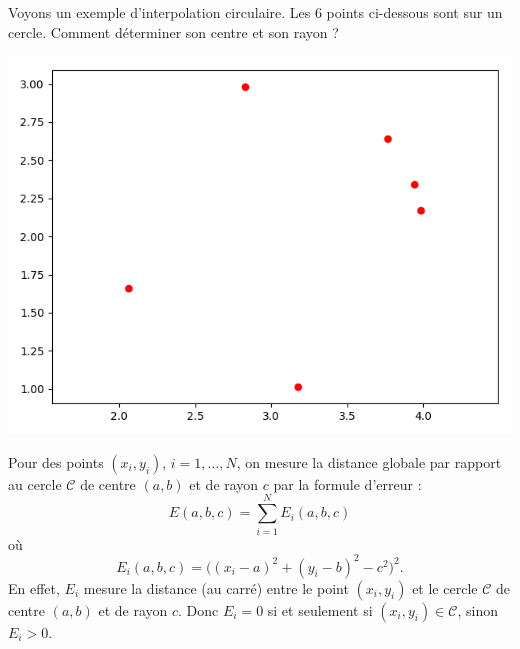 \documentclass[11pt,class=report,crop=false]{standalone}
\begin{document}
\begin{exemple}
Voyons un exemple d'interpolation circulaire.
Les $6$ points ci-dessous sont sur un cercle. Comment déterminer son centre et son rayon ?
\begin{center}
\includegraphics[scale=\myscale,scale=0.5]{figures/circulaire-01}
\end{center}

Pour des points $(x_i,y_i)$, $i=1,\ldots, N$, on mesure la distance globale par rapport au cercle $\mathcal{C}$ de centre $(a,b)$ et de rayon $c$ par la formule d'erreur :
$$E(a,b,c) = \sum_{i=1}^N E_i(a,b,c)$$
où 
$$E_i(a,b,c) = \big( (x_i-a)^2 + (y_i-b)^2 - c^2 \big)^2.$$
En effet, $E_i$ mesure la distance (au carré) entre le point $(x_i,y_i)$ et le cercle $\mathcal{C}$ de centre $(a,b)$ et de rayon $c$. Donc $E_i=0$ si et seulement si $(x_i,y_i) \in \mathcal{C}$, sinon $E_i > 0$.



\end{exemple}
\end{document}
